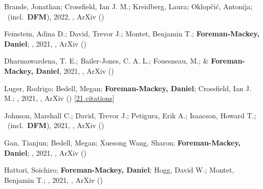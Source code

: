 \item[{\color{numcolor}\scriptsize76}] Brande, Jonathan; Crossfield, Ian J. M.; Kreidberg, Laura; Oklop{\v{c}}i{\'c}, Antonija; \etal\ (incl.\ \textbf{DFM}), 2022, , ArXiv ()

\item[{\color{numcolor}\scriptsize75}] Feinstein, Adina D.; David, Trevor J.; Montet, Benjamin T.; \textbf{Foreman-Mackey, Daniel}; \etal, 2021, , ArXiv ()

\item[{\color{numcolor}\scriptsize74}] Dharmawardena, T. E.; Bailer-Jones, C. A. L.; Fouesneau, M.; \& \textbf{Foreman-Mackey, Daniel}, 2021, , ArXiv ()

\item[{\color{numcolor}\scriptsize73}] Luger, Rodrigo; Bedell, Megan; \textbf{Foreman-Mackey, Daniel}; Crossfield, Ian J. M.; \etal, 2021, , ArXiv () [\href{https://ui.adsabs.harvard.edu/abs/2021arXiv211006271L}{21 citations}]

\item[{\color{numcolor}\scriptsize72}] Johnson, Marshall C.; David, Trevor J.; Petigura, Erik A.; Isaacson, Howard T.; \etal\ (incl.\ \textbf{DFM}), 2021, , ArXiv ()

\item[{\color{numcolor}\scriptsize71}] Gan, Tianjun; Bedell, Megan; Xuesong Wang, Sharon; \textbf{Foreman-Mackey, Daniel}; \etal, 2021, , ArXiv ()

\item[{\color{numcolor}\scriptsize70}] Hattori, Soichiro; \textbf{Foreman-Mackey, Daniel}; Hogg, David W.; Montet, Benjamin T.; \etal, 2021, , ArXiv ()

